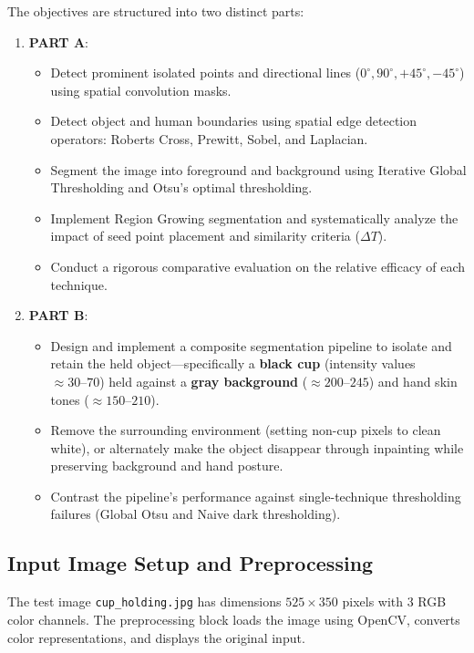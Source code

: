 \documentclass[12pt]{article}
\begin{document}
The objectives are structured into two distinct parts:
\begin{enumerate}
    \item \textbf{PART A}:
    \begin{itemize}
        \item Detect prominent isolated points and directional lines ($0^\circ, 90^\circ, +45^\circ, -45^\circ$) using spatial convolution masks.
        \item Detect object and human boundaries using spatial edge detection operators: Roberts Cross, Prewitt, Sobel, and Laplacian.
        \item Segment the image into foreground and background using Iterative Global Thresholding and Otsu's optimal thresholding.
        \item Implement Region Growing segmentation and systematically analyze the impact of seed point placement and similarity criteria ($\Delta T$).
        \item Conduct a rigorous comparative evaluation on the relative efficacy of each technique.
    \end{itemize}
    \item \textbf{PART B}:
    \begin{itemize}
        \item Design and implement a composite segmentation pipeline to isolate and retain the held object—specifically a \textbf{black cup} (intensity values $\approx 30\text{--}70$) held against a \textbf{gray background} ($\approx 200\text{--}245$) and hand skin tones ($\approx 150\text{--}210$).
        \item Remove the surrounding environment (setting non-cup pixels to clean white), or alternately make the object disappear through inpainting while preserving background and hand posture.
        \item Contrast the pipeline's performance against single-technique thresholding failures (Global Otsu and Naive dark thresholding).
    \end{itemize}
\end{enumerate}

\subsection{Input Image Setup and Preprocessing}
The test image \texttt{cup\_holding.jpg} has dimensions $525 \times 350$ pixels with 3 RGB color channels. The preprocessing block loads the image using OpenCV, converts color representations, and displays the original input.
\end{document}
